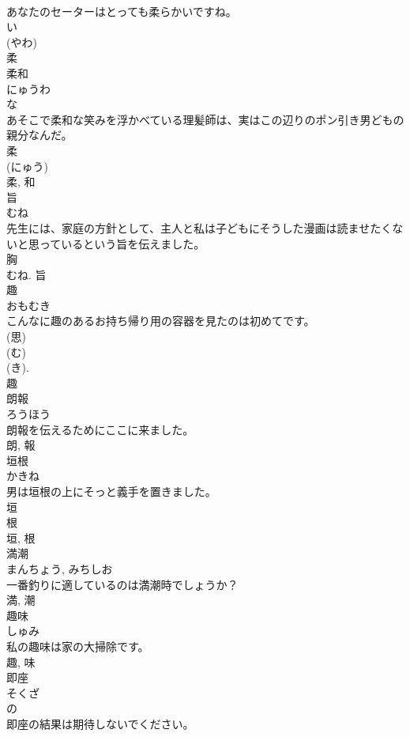 \documentclass[8pt]{extreport}
\begin{document}
\begin{CJK}{UTF8}{min}
\\	あなたのセーターはとっても柔らかいですね。	
\\	い 
\\	(やわ) 
\\	柔	
\\	柔和	
\\	にゅうわ	
\\	な 
\\	あそこで柔和な笑みを浮かべている理髪師は、実はこの辺りのポン引き男どもの親分なんだ。	
\\	柔 
\\	(にゅう) 
\\	柔, 和	
\\	旨	
\\	むね	
\\	先生には、家庭の方針として、主人と私は子どもにそうした漫画は読ませたくないと思っているという旨を伝えました。	
\\	胸 
\\	むね.	旨	
\\	趣	
\\	おもむき	
\\	こんなに趣のあるお持ち帰り用の容器を見たのは初めてです。	
\\	(思) 
\\	(む) 
\\	(き). 
\\	趣	
\\	朗報	
\\	ろうほう	
\\	朗報を伝えるためにここに来ました。	
\\	朗, 報	
\\	垣根	
\\	かきね	
\\	男は垣根の上にそっと義手を置きました。	
\\	垣 
\\	根 
\\	垣, 根	
\\	満潮	
\\	まんちょう, みちしお	
\\	一番釣りに適しているのは満潮時でしょうか？	
\\	満, 潮	
\\	趣味	
\\	しゅみ	
\\	私の趣味は家の大掃除です。	
\\	趣, 味	
\\	即座	
\\	そくざ	
\\	の 
\\	即座の結果は期待しないでください。	

\end{CJK}
\end{document}
